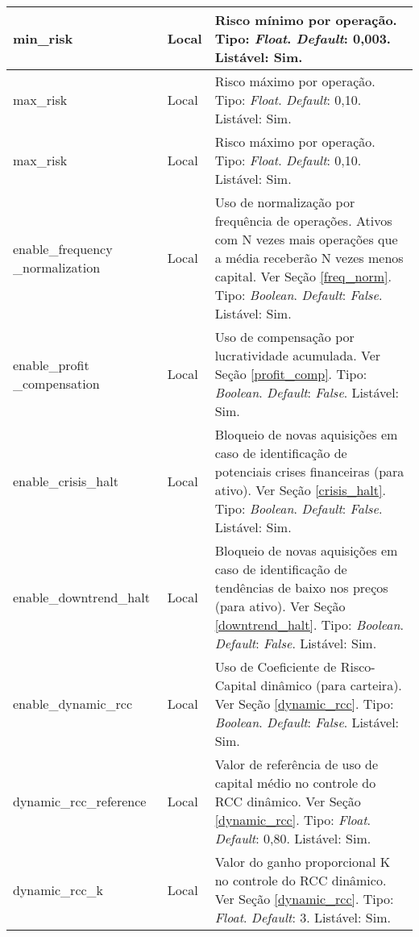 \begin{center}
{\begin{longtable}[m]{| m{11em} | m{3em}| m{21em} |}
        \hline
        min\_risk & Local & Risco mínimo por operação. Tipo: \textit{Float}. \textit{Default}: 0,003. Listável: Sim. \\
        \hline
        max\_risk & Local & Risco máximo por operação. Tipo: \textit{Float}. \textit{Default}: 0,10. Listável: Sim. \\
        \hline
        max\_risk & Local & Risco máximo por operação. Tipo: \textit{Float}. \textit{Default}: 0,10. Listável: Sim. \\
        \hline
        enable\_frequency\hspace{2em} \_normalization & Local & Uso de normalização por frequência de operações. Ativos com N vezes mais operações que a média receberão N vezes menos capital. Ver Seção \ref{freq_norm}. Tipo: \textit{Boolean}. \textit{Default}: \textit{False}. Listável: Sim. \\
        \hline
        enable\_profit\hspace{4em} \_compensation & Local & Uso de compensação por lucratividade acumulada. Ver Seção \ref{profit_comp}. Tipo: \textit{Boolean}. \textit{Default}: \textit{False}. Listável: Sim. \\
        \hline
        enable\_crisis\_halt & Local & Bloqueio de novas aquisições em caso de identificação de potenciais crises financeiras (para ativo). Ver Seção \ref{crisis_halt}. Tipo: \textit{Boolean}. \textit{Default}: \textit{False}. Listável: Sim. \\
        \hline
        enable\_downtrend\_halt & Local & Bloqueio de novas aquisições em caso de identificação de tendências de baixo nos preços (para ativo). Ver Seção \ref{downtrend_halt}. Tipo: \textit{Boolean}. \textit{Default}: \textit{False}. Listável: Sim. \\
        \hline
        enable\_dynamic\_rcc & Local & Uso de Coeficiente de Risco-Capital dinâmico (para carteira). Ver Seção \ref{dynamic_rcc}. Tipo: \textit{Boolean}. \textit{Default}: \textit{False}. Listável: Sim. \\
        \hline
        dynamic\_rcc\_reference & Local & Valor de referência de uso de capital médio no controle do RCC dinâmico. Ver Seção \ref{dynamic_rcc}. Tipo: \textit{Float}. \textit{Default}: 0,80. Listável: Sim. \\
        \hline
        dynamic\_rcc\_k & Local & Valor do ganho proporcional K no controle do RCC dinâmico. Ver Seção \ref{dynamic_rcc}. Tipo: \textit{Float}. \textit{Default}: 3. Listável: Sim. \\
        \hline


\end{longtable}}
\end{center}
